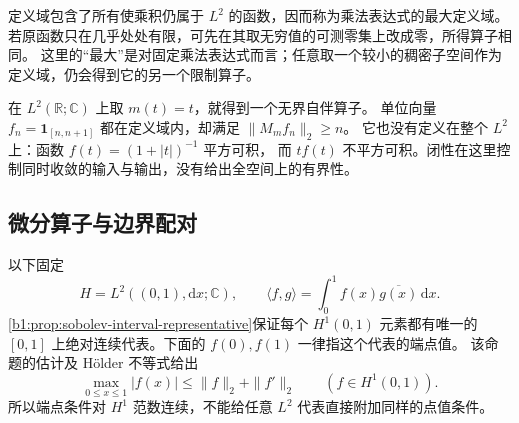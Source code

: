 定义域包含了所有使乘积仍属于 \(L^2\) 的函数，因而称为乘法表达式的最大定义域。
若原函数只在几乎处处有限，可先在其取无穷值的可测零集上改成零，所得算子相同。
这里的“最大”是对固定乘法表达式而言；任意取一个较小的稠密子空间作为定义域，仍会得到它的另一个限制算子。

\ProseParagraphBreak

在 \(L^2(\mathbb R;\mathbb C)\) 上取 \(m(t)=t\)，就得到一个无界自伴算子。
单位向量 \(f_n=\mathbf1_{[n,n+1]}\) 都在定义域内，却满足 \(\|M_mf_n\|_2\geq n\)。
它也没有定义在整个 \(L^2\) 上：函数 \(f(t)=(1+|t|)^{-1}\) 平方可积，
而 \(tf(t)\) 不平方可积。闭性在这里控制同时收敛的输入与输出，没有给出全空间上的有界性。

\subsection{微分算子与边界配对}
\label{b1:subsec:290702}

以下固定
\[
 H=L^2((0,1),\mathrm dx;\mathbb C),\qquad
 \langle f,g\rangle=\int_0^1f(x)\overline{g(x)}\,\mathrm dx.
\]
\cref{b1:prop:sobolev-interval-representative}保证每个 \(H^1(0,1)\) 元素都有唯一的
\([0,1]\) 上绝对连续代表。下面的 \(f(0),f(1)\) 一律指这个代表的端点值。
该命题的估计及 Hölder 不等式给出
\begin{equation}\label{b1:eq:29-endpoint-estimate}
 \max_{0\leq x\leq1}|f(x)|\leq\|f\|_2+\|f'\|_2
 \qquad(f\in H^1(0,1)).
\end{equation}
所以端点条件对 \(H^1\) 范数连续，不能给任意 \(L^2\) 代表直接附加同样的点值条件。

